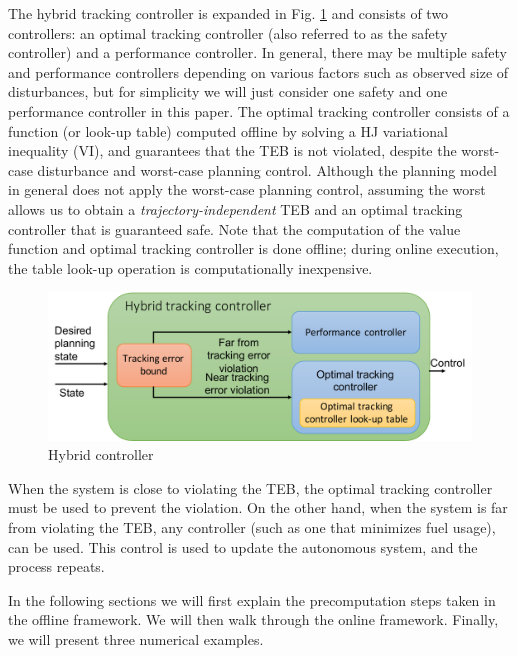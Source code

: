 The hybrid tracking controller is expanded in Fig. \ref{fig:hybrid_ctrl} and consists of two controllers: an optimal tracking controller (also referred to as the safety controller) and a performance controller.
In general, there may be multiple safety and performance controllers depending on various factors such as observed size of disturbances, but for simplicity we will just consider one safety and one performance controller in this paper. 
The optimal tracking controller consists of a function (or look-up table) computed offline by solving a HJ variational inequality (VI), and guarantees that the TEB is not violated, despite the worst-case disturbance and worst-case planning control. 
Although the planning model in general does not apply the worst-case planning control, assuming the worst allows us to obtain a \textit{trajectory-independent} TEB and an optimal tracking controller that is guaranteed safe.
Note that the computation of the value function and optimal tracking controller is done offline; during online execution, the table look-up operation is computationally inexpensive. 
\begin{figure}[h!]
	\centering
	\includegraphics[width=\columnwidth]{fig/hybrid_controller}
	\caption{Hybrid controller}
	\label{fig:hybrid_ctrl}
\end{figure}

When the system is close to violating the TEB, the optimal tracking controller must be used to prevent the violation. 
On the other hand, when the system is far from violating the TEB, any controller (such as one that minimizes fuel usage), can be used. 
This control is used to update the autonomous system, and the process repeats.

In the following sections we will first explain the precomputation steps taken in the offline framework. 
We will then walk through the online framework.
Finally, we will present three numerical examples.

